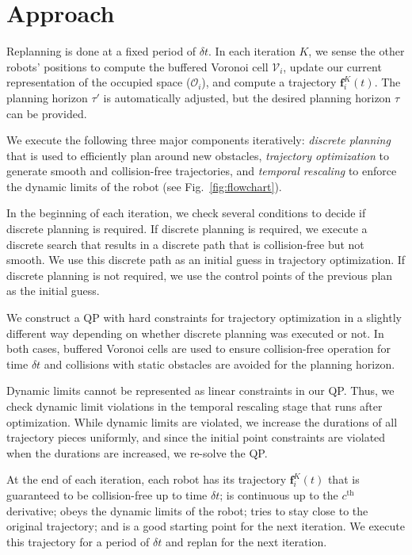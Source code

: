 \documentclass{svproc}
\newcommand{\vf}{\mathbf{f}}
\newcommand{\cV}{\mathcal{V}}
\newcommand{\cO}{\mathcal{O}}
\renewcommand{\th}{^{\text{th}}}
\begin{document}
\section{Approach}
Replanning is done at a fixed period of $\delta t$.
In each iteration $K$, we sense the other robots' positions to compute the buffered Voronoi cell $\cV_i$, update our current representation of the occupied space ($\cO_i$), and compute a trajectory $\vf^K_i(t)$.
The planning horizon $\tau'$ is automatically adjusted, but the desired planning horizon $\tau$ can be provided.

We execute the following three major components iteratively: \emph{discrete planning} that is used to efficiently plan around new obstacles, \emph{trajectory optimization} to generate smooth and collision-free trajectories, and \emph{temporal rescaling} to enforce the dynamic limits of the robot (see Fig.~\ref{fig:flowchart}).

In the beginning of each iteration, we check several conditions to decide if discrete planning is required.
If discrete planning is required, we execute a discrete search that results in a discrete path that is collision-free but not smooth.
We use this discrete path as an initial guess in trajectory optimization.
If discrete planning is not required, we use the control points of the previous plan as the initial guess.

We construct a QP with hard constraints for trajectory optimization in a slightly different way depending on whether discrete planning was executed or not.
In both cases, buffered Voronoi cells are used to ensure collision-free operation for time $\delta t$ and collisions with static obstacles are avoided for the planning horizon.

Dynamic limits cannot be represented as linear constraints in our QP.
Thus, we check dynamic limit violations in the temporal rescaling stage that runs after optimization.
While dynamic limits are violated, we increase the durations of all trajectory pieces uniformly, and since the initial point constraints are violated when the durations are increased, we re-solve the QP.

At the end of each iteration, each robot has its trajectory $\vf^{K}_i(t)$ that is guaranteed to be collision-free up to time $\delta t$; is continuous up to the $c\th$ derivative; obeys the dynamic limits of the robot; tries to stay close to the original trajectory; and is a good starting point for the next iteration. We execute this trajectory for a period of $\delta t$ and replan for the next iteration.
\end{document}
